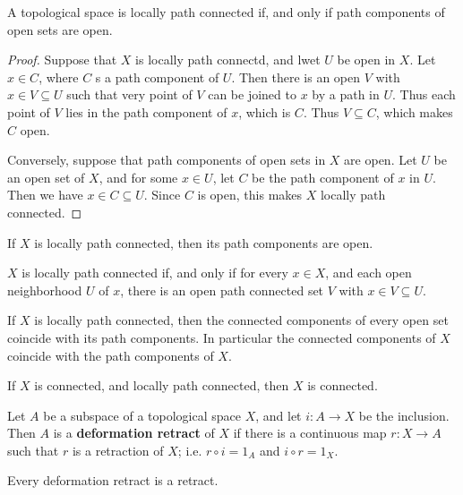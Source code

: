 \begin{theorem}\label{2.4.10}
    A topological space is locally path connected if, and only if path
    components of open sets are open.
\end{theorem}
\begin{proof}
    Suppose that $X$ is locally path connectd, and lwet  $U$ be open in $X$. Let
     $x \in C$, where  $C$ s a path component of  $U$. Then there is an open
     $V$ with  $x \in V \subseteq U$ such that very point of  $V$ can be joined
     to  $x$ by a path in $U$. Thus each point of $V$ lies in the path component
     of $x$, which is $C$. Thus $V \subseteq C$, which makes  $C$ open.

     Conversely, suppose that path components of open sets in  $X$ are open. Let
      $U$ be an open set of  $X$, and for some  $x \in U$, let  $C$ be the path
      component of $x$ in $U$. Then we have $x \in C \subseteq U$. Since $C$ is
      open, this makes $X$ locally path connected.
\end{proof}
\begin{corollary}
    If $X$ is locally path connected, then its path components are open.
\end{corollary}
\begin{corollary}
    $X$ is locally path connected if, and only if for every $x \in X$, and each
    open neighborhood  $U$ of  $x$, there is an open path connected set  $V$
    with  $x \in V \subseteq U$.
\end{corollary}
\begin{corollary}
    If $X$ is locally path connected, then the connected components of every
    open set coincide with its path components. In particular the connected
    components of $X$ coincide with the path components of  $X$.
\end{corollary}
\begin{corollary}
    If $X$ is connected, and locally path connected, then  $X$ is connected.
\end{corollary}

\begin{definition}
    Let $A$ be a subspace of a topological space  $X$, and let  $i:A
    \xrightarrow{} X$ be the inclusion. Then $A$ is a \textbf{deformation
    retract} of $X$ if there is a continuous map  $r:X \xrightarrow{} A$ such
    that $r$ is a retraction of $X$; i.e. $r \circ i=1_A$ and  $i \circ r=1_X$.
\end{definition}

\begin{lemma}\label{2.4.11}
    Every deformation retract is a retract.
\end{lemma}

